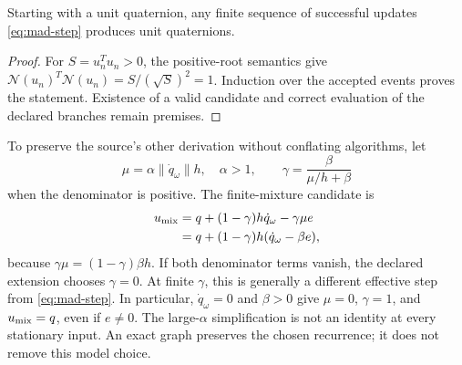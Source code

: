 \begin{proposition}
Starting with a unit quaternion, any finite sequence of successful updates
\eqref{eq:mad-step} produces unit quaternions.
\end{proposition}
\begin{proof}
For $S=u_n^Tu_n>0$, the positive-root semantics give
$\mathcal N(u_n)^T\mathcal N(u_n)=S/(\sqrt S)^2=1$.
Induction over the accepted events proves the statement. Existence of a valid
candidate and correct evaluation of the declared branches remain premises.
\end{proof}

To preserve the source's other derivation without conflating algorithms, let
\[
\mu=\alpha\|\dot q_\omega\|h,\quad \alpha>1,\qquad
\gamma=\frac{\beta}{\mu/h+\beta}
\]
when the denominator is positive. The finite-mixture candidate is
\begin{align*}
u_{\rm mix}&=q+(1-\gamma)h\dot q_\omega-\gamma\mu e\\
 &=q+(1-\gamma)h(\dot q_\omega-\beta e),
\end{align*}
because $\gamma\mu=(1-\gamma)\beta h$. If both denominator terms vanish, the
declared extension chooses $\gamma=0$.
At finite $\gamma$, this is generally a different effective step from
\eqref{eq:mad-step}. In particular, $\dot q_\omega=0$ and $\beta>0$ give
$\mu=0$, $\gamma=1$, and $u_{\rm mix}=q$, even if $e\ne0$. The large-$\alpha$
simplification is not an identity at every stationary input. An exact graph
preserves the chosen recurrence; it does not remove this model choice.

